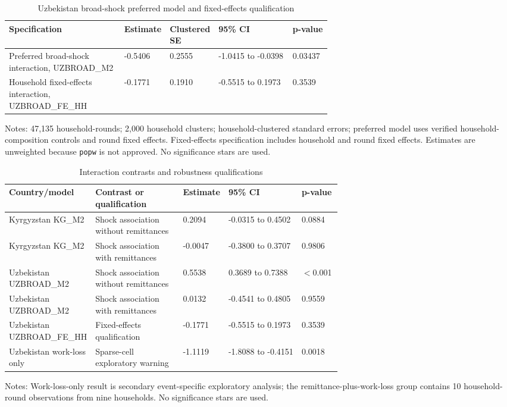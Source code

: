 \documentclass[11pt]{article}
\begin{document}
\clearpage

\begin{table}[!htbp]
\centering
\caption{Uzbekistan broad-shock preferred model and fixed-effects qualification}
\label{tab:uzmodel}
\footnotesize
\begin{tabularx}{\linewidth}{X p{0.14\linewidth} p{0.14\linewidth} p{0.23\linewidth} p{0.12\linewidth}}
\toprule
Specification & Estimate & Clustered SE & 95\% CI & p-value \\
\midrule
Preferred broad-shock interaction, UZBROAD\_M2 & -0.5406 & 0.2555 & -1.0415 to -0.0398 & 0.03437 \\
Household fixed-effects interaction, UZBROAD\_FE\_HH & -0.1771 & 0.1910 & -0.5515 to 0.1973 & 0.3539 \\
\bottomrule
\end{tabularx}
\begin{minipage}{0.95\linewidth}\footnotesize Notes: 47,135 household-rounds; 2,000 household clusters; household-clustered standard errors; preferred model uses verified household-composition controls and round fixed effects. Fixed-effects specification includes household and round fixed effects. Estimates are unweighted because \texttt{popw} is not approved. No significance stars are used.\end{minipage}
\end{table}

\clearpage

\begin{table}[!htbp]
\centering
\caption{Interaction contrasts and robustness qualifications}
\label{tab:contrasts}
\footnotesize
\setlength{\tabcolsep}{5pt}
\begin{tabularx}{\linewidth}{p{0.18\linewidth} X p{0.13\linewidth} p{0.22\linewidth} p{0.12\linewidth}}
\toprule
Country/model & Contrast or qualification & Estimate & 95\% CI & p-value \\
\midrule
Kyrgyzstan KG\_M2 & Shock association without remittances & 0.2094 & -0.0315 to 0.4502 & 0.0884 \\
Kyrgyzstan KG\_M2 & Shock association with remittances & -0.0047 & -0.3800 to 0.3707 & 0.9806 \\
Uzbekistan UZBROAD\_M2 & Shock association without remittances & 0.5538 & 0.3689 to 0.7388 & $<$0.001 \\
Uzbekistan UZBROAD\_M2 & Shock association with remittances & 0.0132 & -0.4541 to 0.4805 & 0.9559 \\
Uzbekistan UZBROAD\_FE\_HH & Fixed-effects qualification & -0.1771 & -0.5515 to 0.1973 & 0.3539 \\
Uzbekistan work-loss only & Sparse-cell exploratory warning & -1.1119 & -1.8088 to -0.4151 & 0.0018 \\
\bottomrule
\end{tabularx}
\begin{minipage}{0.95\linewidth}\footnotesize Notes: Work-loss-only result is secondary event-specific exploratory analysis; the remittance-plus-work-loss group contains 10 household-round observations from nine households. No significance stars are used.\end{minipage}
\end{table}
\end{document}

